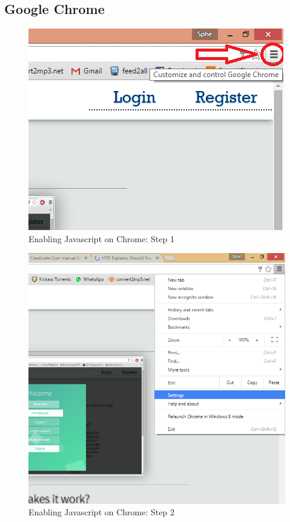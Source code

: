 
\subsection{Google Chrome}
		
		\begin{figure}[!h]
		\centering
			\includegraphics[scale=0.5]{images/javascriptChrome1.png}
			\caption{Enabling Javascript on Chrome: Step 1}
		\end{figure}
		
		\begin{figure}[!h]
		\centering
			\includegraphics[scale=0.5]{images/javascriptChrome2.png}
			\caption{Enabling Javascript on Chrome: Step 2}
		\end{figure}
		

